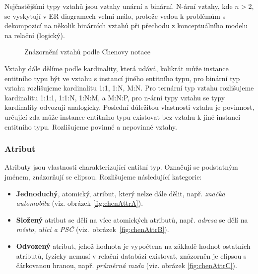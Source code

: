 \documentclass[czech,bachelor,public,dept460,male,oneside]{diploma}
\begin{document}
		Nejčastějšími typy vztahů jsou vztahy unární a binární. N-ární vztahy, kde $n > 2$, se vyskytují v ER diagramech velmi málo, protože vedou k problémům s dekompozicí na několik binárních vztahů při přechodu z konceptuálního modelu na relační (logický).
		
		\begin{figure}[!h]
			\centering
			\caption[Znázornění vztahů podle Chenovy notace]{Znázornění vztahů podle Chenovy notace}
		\end{figure}
	
		Vztahy dále dělíme podle kardinality, která udává, kolikrát může instance entitního typu být ve vztahu s instancí jiného entitního typu, pro binární typ vztahu  rozlišujeme kardinalitu 1:1, 1:N, M:N. Pro ternární typ vztahu rozlišujeme kardinalitu 1:1:1, 1:1:N, 1:N:M, a M:N:P, pro n-ární typy vztahu se typy kardinality odvozují analogicky. Poslední důležitou vlastnosti vztahu je povinnost, určující zda může instance entitního typu existovat bez vztahu k jiné instanci entitního typu. Rozlišujeme povinné a nepovinné vztahy.
		
		\subsubsection{Atribut}
		Atributy jsou vlastnosti charakterizující entitní typ. Označují se podstatným jménem, znázorňují se elipsou. Rozlišujeme následující kategorie:
		
		\begin{itemize}
			\item \textbf{Jednoduchý}, atomický, atribut, který nelze dále dělit, např. \textit{značka automobilu} (viz. obrázek \ref{fig:chenAttrA}).
			\item \textbf{Složený} atribut se dělí na více atomických atributů, např. \textit{adresa} se dělí na \textit{město, ulici a PSČ} (viz.~obrázek~\ref{fig:chenAttrB}).
			\item \textbf{Odvozený} atribut, jehož hodnota je vypočtena na základě hodnot ostatních atributů, fyzicky nemusí v relační databázi existovat, znázorněn je elipsou s čárkovanou hranou, např. \textit{průměrná mzda} (viz. obrázek \ref{fig:chenAttrC}).
		\end{itemize}
	
\end{document}

